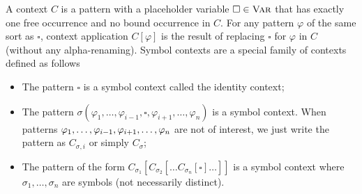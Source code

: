 \documentclass[letter,12pt]{article}
\newcommand{\Var}{\textnormal{\textsc{Var}}}
\newcommand{\ddd}{,\dots,}
\newcommand{\CSub}[1]{C_{#1}}
\newcommand{\Csigma}{\CSub{\sigma}}
\newcommand{\Csigmai}{\CSub{\sigma,i}}
\newcommand{\hole}{\square}
\begin{document}
A context $C$ is a pattern with a placeholder variable
$\hole \in \Var$ that has exactly one free occurrence
and no bound occurrence in $C$.
For any pattern $\varphi$ of the same sort as $\hole$,
context application $C[\varphi]$ is the result of
replacing $\hole$ for $\varphi$ in $C$ (without any alpha-renaming).
Symbol contexts are a special family of contexts defined as follows
\begin{itemize}
\item The pattern $\hole$ is a symbol context called the identity context;
\item The pattern
      $\sigma(\varphi_1 \ddd \varphi_{i-1}, 
              \hole , 
              \varphi_{i+1} \ddd \varphi_n)$
      is a symbol context.
      When patterns 
      $\varphi_1 \ddd \varphi_{i-1},\\ \varphi_{i+1} \ddd \varphi_n$
      are not of interest,
      we just write the pattern as $\Csigmai$ or simply $\Csigma$;
\item The pattern of the form
      $
      \CSub{\sigma_1}[\CSub{\sigma_2}[\dots  \CSub{\sigma_n}[\hole] \dots]]
      $
      is a symbol context
      where $\sigma_1 \ddd \sigma_n$ are symbols (not necessarily distinct).
\end{itemize}
\end{document}
